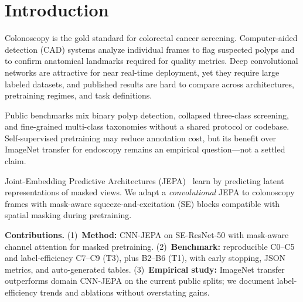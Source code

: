 \section{Introduction}
\label{sec:intro}

Colonoscopy is the gold standard for colorectal cancer screening.
Computer-aided detection (CAD) systems analyze individual frames to flag suspected polyps and to confirm anatomical landmarks required for quality metrics.
Deep convolutional networks are attractive for near real-time deployment, yet they require large labeled datasets, and published results are hard to compare across architectures, pretraining regimes, and task definitions.

Public benchmarks mix binary polyp detection, collapsed three-class screening, and fine-grained multi-class taxonomies without a shared protocol or codebase.
Self-supervised pretraining may reduce annotation cost, but its benefit over ImageNet transfer for endoscopy remains an empirical question---not a settled claim.

Joint-Embedding Predictive Architectures (JEPA)~\cite{lecun2022path,assran2023ijepa} learn by predicting latent representations of masked views.
We adapt a \emph{convolutional} JEPA to colonoscopy frames with mask-aware squeeze-and-excitation (SE) blocks compatible with spatial masking during pretraining.


\textbf{Contributions.}
(1)~\textbf{Method:} CNN-JEPA on SE-ResNet-50 with mask-aware channel attention for masked pretraining.
(2)~\textbf{Benchmark:} reproducible C0--C5 and label-efficiency C7--C9 (T3), plus B2--B6 (T1), with early stopping, JSON metrics, and auto-generated tables.
(3)~\textbf{Empirical study:} ImageNet transfer outperforms domain CNN-JEPA on the current public splits; we document label-efficiency trends and ablations without overstating gains.

